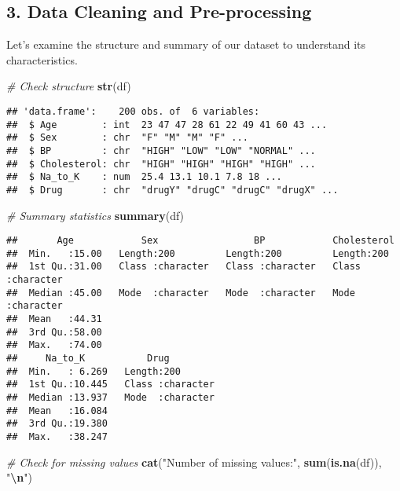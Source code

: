 \documentclass[
]{article}
\newenvironment{Shaded}{\begin{snugshade}}{\end{snugshade}}
\newcommand{\CommentTok}[1]{\textcolor[rgb]{0.56,0.35,0.01}{\textit{#1}}}
\newcommand{\FunctionTok}[1]{\textcolor[rgb]{0.13,0.29,0.53}{\textbf{#1}}}
\newcommand{\NormalTok}[1]{#1}
\newcommand{\SpecialCharTok}[1]{\textcolor[rgb]{0.81,0.36,0.00}{\textbf{#1}}}
\newcommand{\StringTok}[1]{\textcolor[rgb]{0.31,0.60,0.02}{#1}}
\begin{document}
\subsection{3. Data Cleaning and
Pre-processing}\label{data-cleaning-and-pre-processing}

Let's examine the structure and summary of our dataset to understand its
characteristics.

\begin{Shaded}
\begin{Highlighting}[]
\CommentTok{\# Check structure}
\FunctionTok{str}\NormalTok{(df)}
\end{Highlighting}
\end{Shaded}

\begin{verbatim}
## 'data.frame':    200 obs. of  6 variables:
##  $ Age        : int  23 47 47 28 61 22 49 41 60 43 ...
##  $ Sex        : chr  "F" "M" "M" "F" ...
##  $ BP         : chr  "HIGH" "LOW" "LOW" "NORMAL" ...
##  $ Cholesterol: chr  "HIGH" "HIGH" "HIGH" "HIGH" ...
##  $ Na_to_K    : num  25.4 13.1 10.1 7.8 18 ...
##  $ Drug       : chr  "drugY" "drugC" "drugC" "drugX" ...
\end{verbatim}

\begin{Shaded}
\begin{Highlighting}[]
\CommentTok{\# Summary statistics}
\FunctionTok{summary}\NormalTok{(df)}
\end{Highlighting}
\end{Shaded}

\begin{verbatim}
##       Age            Sex                 BP            Cholesterol       
##  Min.   :15.00   Length:200         Length:200         Length:200        
##  1st Qu.:31.00   Class :character   Class :character   Class :character  
##  Median :45.00   Mode  :character   Mode  :character   Mode  :character  
##  Mean   :44.31                                                           
##  3rd Qu.:58.00                                                           
##  Max.   :74.00                                                           
##     Na_to_K           Drug          
##  Min.   : 6.269   Length:200        
##  1st Qu.:10.445   Class :character  
##  Median :13.937   Mode  :character  
##  Mean   :16.084                     
##  3rd Qu.:19.380                     
##  Max.   :38.247
\end{verbatim}

\begin{Shaded}
\begin{Highlighting}[]
\CommentTok{\# Check for missing values}
\FunctionTok{cat}\NormalTok{(}\StringTok{"Number of missing values:"}\NormalTok{, }\FunctionTok{sum}\NormalTok{(}\FunctionTok{is.na}\NormalTok{(df)), }\StringTok{"}\SpecialCharTok{\textbackslash{}n}\StringTok{"}\NormalTok{)}
\end{Highlighting}
\end{Shaded}
\end{document}
